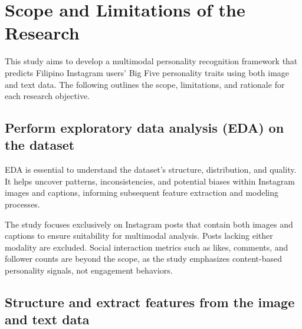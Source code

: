 %
%




\section{Scope and Limitations of the Research}
\label{sec:scopelimitations}


	This study aims to develop a multimodal personality recognition framework that predicts Filipino Instagram users’ Big Five personality traits using both image and text data. The following outlines the scope, limitations, and rationale for each research objective.
	\subsection{Perform exploratory data analysis (EDA) on the dataset}
	
	EDA is essential to understand the dataset’s structure, distribution, and quality. It helps uncover patterns, inconsistencies, and potential biases within Instagram images and captions, informing subsequent feature extraction and modeling processes.
	
	The study focuses exclusively on Instagram posts that contain both images and captions to ensure suitability for multimodal analysis. Posts lacking either modality are excluded. Social interaction metrics such as likes, comments, and follower counts are beyond the scope, as the study emphasizes content-based personality signals, not engagement behaviors.
	
	\subsection{Structure and extract features from the image and text data}
	
